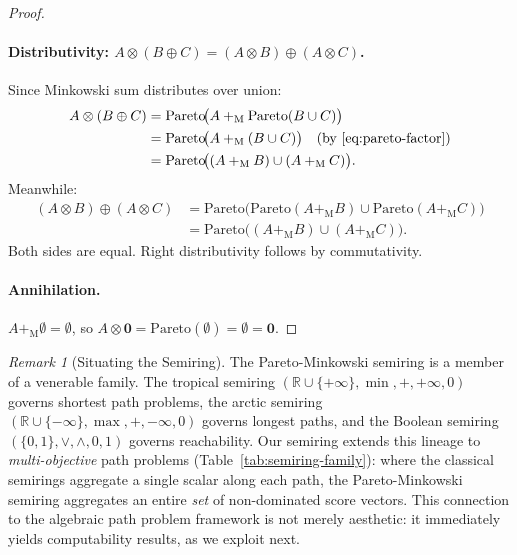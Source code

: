 \documentclass[11pt, letterpaper]{article}
\theoremstyle{definition}
\theoremstyle{remark}
\newtheorem{remark}[theorem]{Remark}
\begin{document}
\begin{proof}
\paragraph{Distributivity: $A \otimes (B \oplus C) = (A \otimes B) \oplus (A \otimes C)$.}
Since Minkowski sum distributes over union:
\begin{align*}
    A \otimes (B \oplus C)
    &= \mathrm{Pareto}\!\bigl(A +_{\mathrm{M}} \mathrm{Pareto}(B \cup C)\bigr) \\
    &= \mathrm{Pareto}\!\bigl(A +_{\mathrm{M}} (B \cup C)\bigr) \quad\text{(by~\eqref{eq:pareto-factor})} \\
    &= \mathrm{Pareto}\!\bigl((A +_{\mathrm{M}} B) \cup (A +_{\mathrm{M}} C)\bigr).
\end{align*}
Meanwhile:
\begin{align*}
    (A \otimes B) \oplus (A \otimes C)
    &= \mathrm{Pareto}\!\bigl(\mathrm{Pareto}(A +_{\mathrm{M}} B) \cup \mathrm{Pareto}(A +_{\mathrm{M}} C)\bigr) \\
    &= \mathrm{Pareto}\!\bigl((A +_{\mathrm{M}} B) \cup (A +_{\mathrm{M}} C)\bigr).
\end{align*}
Both sides are equal.
Right distributivity follows by commutativity.

\paragraph{Annihilation.}
$A +_{\mathrm{M}} \emptyset = \emptyset$, so $A \otimes \mathbf{0} = \mathrm{Pareto}(\emptyset) = \emptyset = \mathbf{0}$.
\end{proof}

\begin{remark}[Situating the Semiring]
The Pareto-Minkowski semiring is a member of a venerable family.
The tropical semiring $(\mathbb{R} \cup \{+\infty\}, \min, +, +\infty, 0)$ governs shortest path problems, the arctic semiring $(\mathbb{R} \cup \{-\infty\}, \max, +, -\infty, 0)$ governs longest paths, and the Boolean semiring $(\{0,1\}, \lor, \land, 0, 1)$ governs reachability.
Our semiring extends this lineage to \emph{multi-objective} path problems (Table~\ref{tab:semiring-family}): where the classical semirings aggregate a single scalar along each path, the Pareto-Minkowski semiring aggregates an entire \emph{set} of non-dominated score vectors.
This connection to the algebraic path problem framework \cite{Gondran2008, Mohri2002} is not merely aesthetic: it immediately yields computability results, as we exploit next.
\end{remark}
\end{document}
